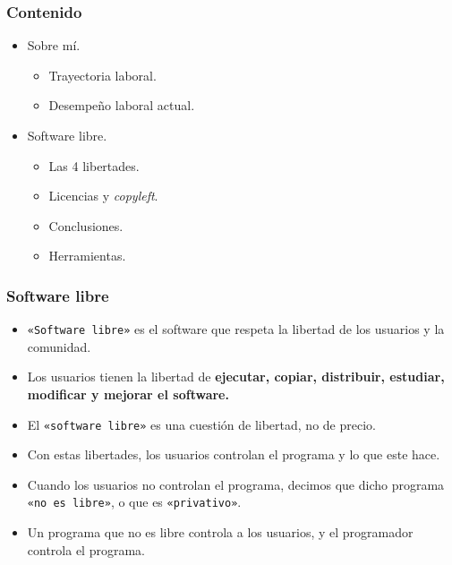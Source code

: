 \documentclass[12pt]{beamer}
\begin{document}
\begin{frame}%
  \frametitle{Contenido}
  \begin{itemize}
    \item<0> Sobre mí.
      \begin{itemize}
      \item<0> Trayectoria laboral.
      \item<0> Desempeño laboral actual.
      \end{itemize}
    \item<1> Software libre.    
      \begin{itemize}
      \item<1> Las 4 libertades.
      \item<1> Licencias y \textit{copyleft}.
      \item<1> Conclusiones.
      \item<1> Herramientas.
      \end{itemize}
    \end{itemize}
\end{frame}

\begin{frame}
  \frametitle{Software libre}
  \begin{itemize}
  \item \texttt{«Software libre»} es el software que respeta la libertad de los usuarios y la
    comunidad.
  \item Los usuarios tienen la libertad de {\bfseries ejecutar, copiar, distribuir, estudiar,
    modificar y mejorar el software.}
  \item El \texttt{«software libre»} es una cuestión de libertad, no de precio.
  \item Con estas libertades, los usuarios controlan el programa y lo que este hace.
  \item Cuando los usuarios no controlan el programa, decimos que dicho programa \texttt{«no es
    libre»}, o que es \texttt{«privativo»}.
  \item Un programa que no es libre controla a los usuarios, y el programador controla el programa.
  \end{itemize}  
\end{frame}
\end{document}
